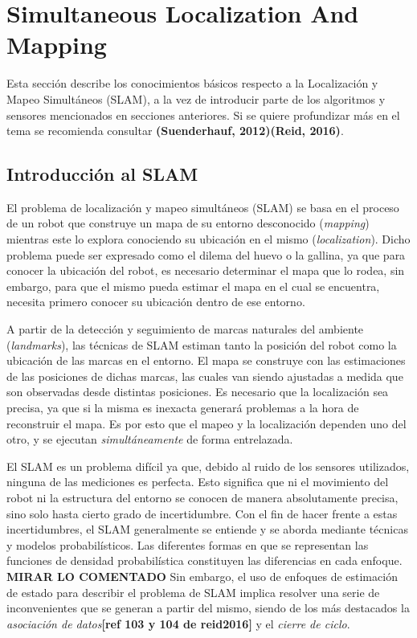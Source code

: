 \section{Simultaneous Localization And Mapping}
\label{sec:slam}
Esta sección describe los conocimientos básicos respecto a la Localización y Mapeo Simultáneos (SLAM), a la vez de introducir parte de los algoritmos y sensores mencionados en secciones anteriores. Si se quiere profundizar más en el tema se recomienda consultar \textbf{(Suenderhauf, 2012)(Reid, 2016)}.

\subsection{Introducción al SLAM}
El problema de localización y mapeo simultáneos (SLAM) se basa en el proceso de un robot que construye un mapa de su entorno desconocido (\textit{mapping}) mientras este lo explora conociendo su ubicación en el mismo (\textit{localization}). Dicho problema puede ser expresado como el dilema del huevo o la gallina, ya que para conocer la ubicación del robot, es necesario determinar el mapa que lo rodea, sin embargo, para que el mismo pueda estimar el mapa en el cual se encuentra, necesita primero conocer su ubicación dentro de ese entorno. 

A partir de la detección y seguimiento de marcas naturales del ambiente (\textit{landmarks}), las técnicas de SLAM  estiman  tanto  la  posición  del  robot  como  la  ubicación  de las marcas en el entorno. El mapa se construye con las estimaciones de las posiciones  de  dichas  marcas,  las  cuales  van  siendo ajustadas  a  medida  que  son observadas desde distintas posiciones. Es necesario que la localización sea precisa, ya que si la misma es inexacta generará problemas a la hora de reconstruir el mapa. Es por esto que el mapeo y la localización dependen uno del otro, y se ejecutan \textit{simultáneamente} de forma entrelazada.

El SLAM es un problema difícil ya que, debido al ruido de los sensores utilizados, ninguna de las mediciones es perfecta. Esto significa que ni el movimiento del robot ni la estructura del entorno se conocen de manera absolutamente precisa, sino solo hasta cierto grado de incertidumbre. Con el fin de hacer frente a estas incertidumbres, el SLAM generalmente se entiende y se aborda mediante técnicas y modelos probabilísticos. Las diferentes formas en que se representan las funciones de densidad probabilística constituyen las diferencias en cada enfoque. 
\textbf{MIRAR LO COMENTADO}
Sin embargo, el uso de enfoques de estimación de estado para describir el problema de SLAM implica resolver una serie de inconvenientes que se generan a partir del mismo, siendo de los más destacados la \textit{asociación de datos}\textbf{[ref 103 y 104 de reid2016]} y el \textit{cierre de ciclo}.


